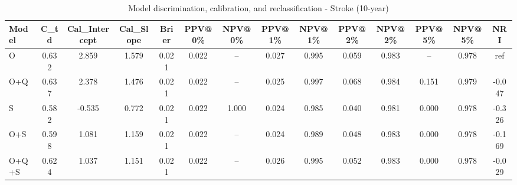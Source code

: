 \begin{table}[htbp]
\centering
\small
\caption{Model discrimination, calibration, and reclassification - Stroke (10-year)}
\label{tab:perf_stroke_10y}
\begin{tabular}{lccccccccccccc}
\toprule
Model & C\_td & Cal\_Intercept & Cal\_Slope & Brier & PPV@0\% & NPV@0\% & PPV@1\% & NPV@1\% & PPV@2\% & NPV@2\% & PPV@5\% & NPV@5\% & NRI \\
\midrule
O & 0.632 & 2.859 & 1.579 & 0.021 & 0.022 & -- & 0.027 & 0.995 & 0.059 & 0.983 & -- & 0.978 & ref \\
O+Q & 0.637 & 2.378 & 1.476 & 0.021 & 0.022 & -- & 0.025 & 0.997 & 0.068 & 0.984 & 0.151 & 0.979 & -0.047 \\
S & 0.582 & -0.535 & 0.772 & 0.021 & 0.022 & 1.000 & 0.024 & 0.985 & 0.040 & 0.981 & 0.000 & 0.978 & -0.326 \\
O+S & 0.598 & 1.081 & 1.159 & 0.021 & 0.022 & -- & 0.024 & 0.989 & 0.048 & 0.983 & 0.000 & 0.978 & -0.169 \\
O+Q+S & 0.624 & 1.037 & 1.151 & 0.021 & 0.022 & -- & 0.026 & 0.995 & 0.052 & 0.983 & 0.000 & 0.978 & -0.029 \\
\bottomrule
\end{tabular}
\end{table}